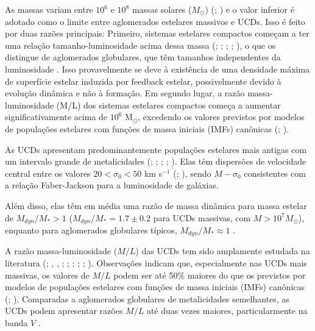As massas variam entre $10^6$ e $10^8$ massas solares ($M_{\odot}$) (\citealp{Mieske_2008_1}; \citealp{Misgeld_2011_2}) e o valor inferior é adotado como o limite entre aglomerados estelares massivos e UCDs. Isso é feito por duas razões principais: Primeiro, sistemas estelares compactos começam a ter uma relação tamanho-luminosidade acima dessa massa (\citealp{Hasegan_2005}; \citealp{Cote_2006}; \citealp{Rejkuba_2007}; \citealp{Evstigneeva_2008}; \citealp{Norris_2011}), o que os distingue de aglomerados globulares, que têm tamanhos independentes da luminosidade \citep{Jornan_2005}. Isso provavelmente se deve à existência de uma densidade máxima de superfície estelar induzida por feedback estelar, possivelmente devido à evolução dinâmica e não à formação. Em segundo lugar, a razão massa-luminosidade (M/L) dos sistemas estelares compactos começa a aumentar significativamente acima de $10^6$ M$_\odot$, excedendo os valores previstos por modelos de populações estelares com funções de massa iniciais (IMFs) canônicas (\citealp{Hasegan_2005}; \citealp{Dabringhausen_2008}).

As UCDs apresentam predominantemente populações estelares mais antigas com um intervalo grande de metalicidades (\citealp{Evstigneeva_2009}; \citealp{Janz_2015}; \citealp{Zhang_2018}; \citealp{Forbes_2020}; \citealp{Fahrion_2020}). Elas têm dispersões de velocidade central entre os valores $20 < \sigma_0 < 50$ km s$^{-1}$ (\citealp{Hasegan_2005}; \citealp{Mieske_2008_1}), sendo $M-\sigma_0$ consistentes com a relação Faber-Jackson para a luminosidade de galáxias.

Além disso, elas têm em média uma razão de massa dinâmica para massa estelar de $M_{dyn}/M_* > 1$ ($M_{dyn}/M_* = 1.7 \pm 0.2$ para UCDs massivas, com $M > 10^7 M_{\odot}$), enquanto para aglomerados globulares típicos, $M_{dyn}/M_* \approx 1$ \citep{Mieske_2013}.

A razão massa-luminosidade ($M/L$) das UCDs tem sido amplamente estudada na literatura (\citealp{Hasegan_2005}; \citealp{Dabringhausen_2009}, \citeyear{Dabringhausen_2010}, \citeyear{Dabringhausen_2012}; \citealp{Baumgardt_2008}; \citealp{Mieske_2008_2}; \citealp{Taylor_2010}; \citealp{Frank_2011}; \citealp{Strader_2013}). Observações indicam que, especialmente nas UCDs mais massivas, os valores de $M/L$ podem ser até 50\% maiores do que os previstos por modelos de populações estelares com funções de massa iniciais (IMFs) canônicas (\citealp{Hasegan_2005}; \citealp{Mieske_2008_2}). Comparadas a aglomerados globulares de metalicidades semelhantes, as UCDs podem apresentar razões $M/L$ até duas vezes maiores, particularmente na banda $V$ .

